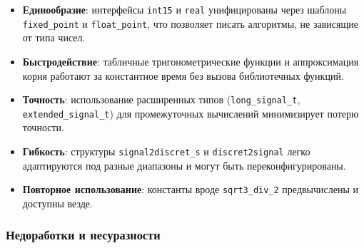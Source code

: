 \documentclass[a4paper,12pt]{article}
\begin{document}
\begin{itemize}
    \item \textbf{Единообразие}: интерфейсы \texttt{int15} и \texttt{real} унифицированы через шаблоны \texttt{fixed\_point} и \texttt{float\_point}, что позволяет писать алгоритмы, не зависящие от типа чисел.
    \item \textbf{Быстродействие}: табличные тригонометрические функции и аппроксимация корня работают за константное время без вызова библиотечных функций.
    \item \textbf{Точность}: использование расширенных типов (\texttt{long\_signal\_t}, \texttt{extended\_signal\_t}) для промежуточных вычислений минимизирует потерю точности.
    \item \textbf{Гибкость}: структуры \texttt{signal2discret\_s} и \texttt{discret2signal} легко адаптируются под разные диапазоны и могут быть переконфигурированы.
    \item \textbf{Повторное использование}: константы вроде \texttt{sqrt3\_div\_2} предвычислены и доступны везде.
\end{itemize}

\subsubsection{Недоработки и несуразности}
\end{document}
